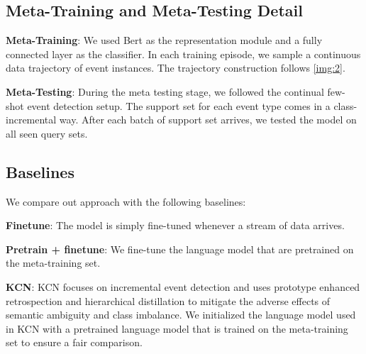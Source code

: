 \subsection{Meta-Training and Meta-Testing Detail}
\textbf{Meta-Training}: We used Bert \citep{devlin2018bert} as the representation module and a fully connected layer as the classifier.  In each training episode, we sample a continuous data trajectory of event instances.  The trajectory construction follows \ref{img:2}. 

\noindent
\textbf{Meta-Testing}: During the meta testing stage,  we followed the continual few-shot event detection setup. The support set for each event type comes in a class-incremental way. After each batch of support set arrives, we tested the model on all seen query sets. 

\subsection{Baselines}
We compare out approach with the following baselines: 

\noindent
\textbf{Finetune}: The model is simply fine-tuned whenever a stream of data arrives.

\noindent
\textbf{Pretrain + finetune}: We fine-tune the language model that are pretrained on the meta-training set. 

\noindent
\textbf{KCN}\citep{cao2020incremental}: KCN focuses on incremental event detection and uses prototype enhanced retrospection and hierarchical distillation to mitigate the adverse effects of semantic ambiguity and class imbalance. We initialized the language model used in KCN with a pretrained language model that is trained on the meta-training set to ensure a fair comparison. 

